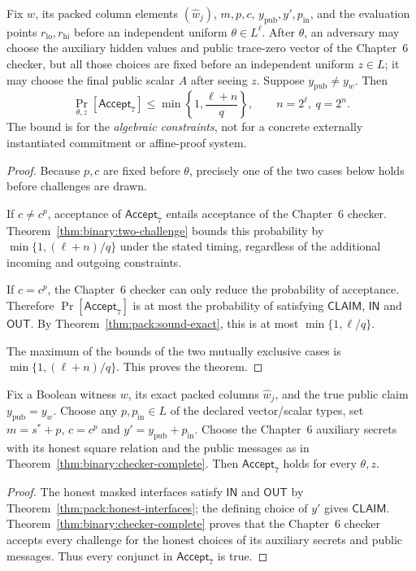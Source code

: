 \begin{theorem}\label{thm:pack:algebraic-sound}
Fix $w$, its packed column elements
$(\widehat w_j)$, $m,p,c$,
$y_{\mathrm{pub}},y',p_{\mathrm{in}}$,
and the evaluation points
$r_{\mathrm{lo}},r_{\mathrm{hi}}$
before an independent uniform
$\theta\in L^\ell$.
After $\theta$, an adversary may choose
the auxiliary hidden values and public
trace-zero vector of the Chapter~6 checker,
but all those choices are fixed before
an independent uniform $z\in L$;
it may choose the final public scalar
$A$ after seeing $z$.
Suppose $y_{\mathrm{pub}}\neq y_w$.
Then
\[
 \boxed{
 \Pr_{\theta,z}[\mathsf{Accept}_{7}]
 \leq
 \min\left\{1,\frac{\ell+n}{q}\right\},
 \qquad n=2^\ell,\ q=2^n.}
\]
The bound is for the \emph{algebraic constraints},
not for a concrete externally instantiated
commitment or affine-proof system.
\end{theorem}
\begin{proof}
Because $p,c$ are fixed before
$\theta$, precisely one of the two
cases below holds before challenges
are drawn.

If $c\neq c^p$, acceptance of
$\mathsf{Accept}_{7}$ entails
acceptance of the Chapter~6 checker.
Theorem~\ref{thm:binary:two-challenge}
bounds this probability by
$\min\{1,(\ell+n)/q\}$
under the stated timing, regardless
of the additional incoming and outgoing
constraints.

If $c=c^p$, the Chapter~6 checker
can only reduce the probability of
acceptance. Therefore
$\Pr[\mathsf{Accept}_{7}]$ is at most
the probability of satisfying
$\mathsf{CLAIM}$, $\mathsf{IN}$ and
$\mathsf{OUT}$.
By Theorem~\ref{thm:pack:sound-exact},
this is at most $\min\{1,\ell/q\}$.

The maximum of the bounds of the two
mutually exclusive cases is
$\min\{1,(\ell+n)/q\}$.
This proves the theorem.
\end{proof}

\begin{theorem}\label{thm:pack:algebraic-complete}
Fix a Boolean witness $w$,
its exact packed columns $\widehat w_j$,
and the true public claim
$y_{\mathrm{pub}}=y_w$.
Choose any $p,p_{\mathrm{in}}\in L$
of the declared vector/scalar types,
set $m=s^*+p$, $c=c^p$ and
$y'=y_{\mathrm{pub}}+p_{\mathrm{in}}$.
Choose the Chapter~6 auxiliary
secrets with its honest square relation
and the public messages as in
Theorem~\ref{thm:binary:checker-complete}.
Then $\mathsf{Accept}_{7}$ holds
for every $\theta,z$.
\end{theorem}
\begin{proof}
The honest masked interfaces satisfy
$\mathsf{IN}$ and $\mathsf{OUT}$ by
Theorem~\ref{thm:pack:honest-interfaces};
the defining choice of $y'$
gives $\mathsf{CLAIM}$.
Theorem~\ref{thm:binary:checker-complete}
proves that the Chapter~6 checker
accepts every challenge for the honest
choices of its auxiliary secrets and
public messages. Thus every conjunct
in $\mathsf{Accept}_{7}$ is true.
\end{proof}

